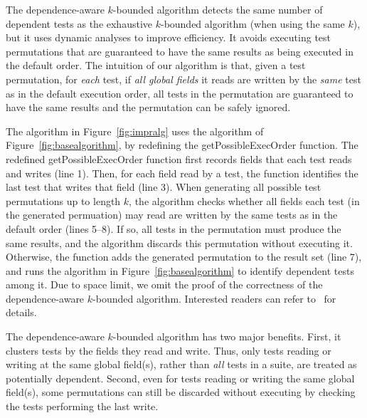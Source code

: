 
The dependence-aware $k$-bounded algorithm
detects the same number of dependent tests
as the exhaustive $k$-bounded algorithm (when using the same $k$),
but it uses dynamic analyses to improve efficiency.
It avoids executing test
permutations that are guaranteed to have the
same results as being executed in the default order.
The intuition of our algorithm is that,
given a test permutation, for \textit{each}
test, if \textit{all global fields} it reads
are written by the \textit{same} test as
in the default execution order, all tests in
the permutation are guaranteed to
have the same results and the permutation can be safely ignored. 

The algorithm in Figure~\ref{fig:impralg} uses the
algorithm of Figure~\ref{fig:basealgorithm}, by redefining
the getPossibleExecOrder function. The redefined
getPossibleExecOrder function first records
fields that each test reads and writes (line 1).
Then, for each field read by a test,
the function identifies the last test that writes
that field (line 3).
When generating all possible test permutations
up to length $k$, the algorithm checks whether
all fields each test (in the generated permuation)
may read are written by the same tests as in the
default order (lines 5--8). If so, all tests in the permutation
must produce the same results, and the algorithm discards
this permutation without executing it. Otherwise,
the function adds the generated permutation to the result
set (line 7), and runs the algorithm in Figure~\ref{fig:basealgorithm}
to identify dependent tests among it.
Due to space limit, we omit the proof of the correctness
of the dependence-aware $k$-bounded algorithm. Interested
readers can refer to~\cite{proof-dependence-aware} for details.

The dependence-aware $k$-bounded algorithm has two major benefits.
First, it clusters tests by the fields they
read and write. Thus, only tests reading or writing at
the same global field(s), rather than \textit{all} tests
in a suite, are treated as potentially dependent.
Second, even for tests reading or writing the same global
field(s), some permutations can still be discarded
without executing by checking the tests performing the last write.


